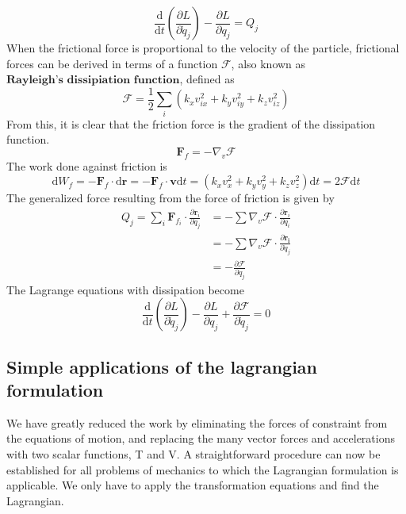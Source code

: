 \documentclass[]{article}
\numberwithin{equation}{section}
\begin{document}
$$\frac{\mathrm d}{\mathrm dt}\left(\frac{\partial L}{\partial\dot q_j}\right)-\frac{\partial L}{\partial q_j}=Q_j$$
When the frictional force is proportional to the velocity of the particle, frictional forces can be derived in terms of a function $\mathcal F$, also known as $\textbf{Rayleigh's dissipiation function}$, defined as 
\begin{equation}
	\mathcal F=\frac 12\sum_i\left(k_x v_{ix}^2+k_yv_{iy}^2+k_zv_{iz}^2\right)
\end{equation}
From this, it is clear that the friction force is the gradient of the dissipation function. 
$$\mathbf F_f=-\nabla_v\mathcal F$$
The work done against friction is 
$$\mathrm dW_f=-\mathbf F_f\cdot\mathrm d\mathbf r=-\mathbf F_f\cdot\mathbf v\mathrm dt=\left(k_xv_x^2+k_yv_y^2+k_zv_z^2\right)\mathrm dt=2\mathcal F\mathrm dt$$
The generalized force resulting from the force of friction is given by
\begin{align*}
	Q_j=\sum_i\mathbf F_{f_i}\cdot\frac{\partial\mathbf r_i}{\partial q_j}&=-\sum\nabla_v\mathcal F\cdot\frac{\partial\mathbf r_i}{\partial q_i}\\
	&=-\sum\nabla_v\mathcal F\cdot\frac{\partial\mathbf{\dot r_i}}{\partial\dot q_j}\\
	&=-\frac{\partial\mathcal F}{\partial\dot q_j}
\end{align*}
The Lagrange equations with dissipation become 
\begin{equation}
	\frac{\mathrm d}{\mathrm dt}\left(\frac{\partial L}{\partial \dot q_j}\right)-\frac{\partial L}{\partial q_j}+\frac{\partial \mathcal F}{\partial \dot q_j}=0
\end{equation}
\subsection{Simple applications of the lagrangian formulation}
We have greatly reduced the work by eliminating the forces of constraint from the equations of motion, and replacing the many vector forces and accelerations with two scalar functions, T and V.  A straightforward procedure can now be established for all problems of mechanics to which the Lagrangian formulation is applicable. We only have to apply the transformation equations and find the Lagrangian. 
\end{document}
